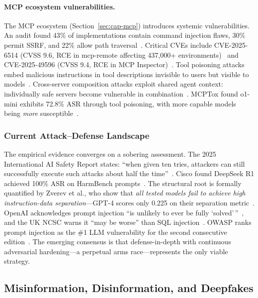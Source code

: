\paragraph{MCP ecosystem vulnerabilities.}
The MCP ecosystem (Section~\ref{sec:cap-mcp}) introduces systemic vulnerabilities. An audit found 43\% of implementations contain command injection flaws, 30\% permit SSRF, and 22\% allow path traversal~\cite{equixly2025mcp}. Critical CVEs include CVE-2025-6514 (CVSS 9.6, RCE in mcp-remote affecting 437,000+ environments)~\cite{jfrog2025mcpremote} and CVE-2025-49596 (CVSS 9.4, RCE in MCP Inspector)~\cite{oligo2025inspector}. Tool poisoning attacks embed malicious instructions in tool descriptions invisible to users but visible to models~\cite{invariant2025toolpoisoning}. Cross-server composition attacks exploit shared agent context: individually safe servers become vulnerable in combination~\cite{invariant2025whatsapp,croce2025trivial}. MCPTox found o1-mini exhibits 72.8\% ASR through tool poisoning, with more capable models being \emph{more} susceptible~\cite{wang2025mcptox}.


\subsubsection{Current Attack--Defense Landscape}
\label{sec:threat-landscape}

The empirical evidence converges on a sobering assessment. The 2025 International AI Safety Report states: ``when given ten tries, attackers can still successfully execute such attacks about half the time''~\cite{aisafetyreport2025}. Cisco found DeepSeek R1 achieved 100\% ASR on HarmBench prompts~\cite{cisco2025deepseek}. The structural root is formally quantified by Zverev et al., who show that \emph{all tested models fail to achieve high instruction-data separation}---GPT-4 scores only 0.225 on their separation metric~\cite{zverev2025separation}. OpenAI acknowledges prompt injection ``is unlikely to ever be fully `solved'\,''~\cite{openai2025atlas}, and the UK NCSC warns it ``may be worse'' than SQL injection~\cite{ncsc2025promptinjection}. OWASP ranks prompt injection as the \#1 LLM vulnerability for the second consecutive edition~\cite{owasp2025}. The emerging consensus is that defense-in-depth with continuous adversarial hardening---a perpetual arms race---represents the only viable strategy.


\subsection{Misinformation, Disinformation, and Deepfakes}
\label{sec:threat-misinfo}

